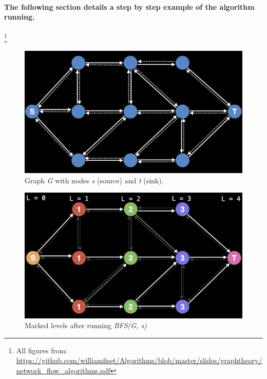 \documentclass{report}
\begin{document}
\paragraph{The following section details a step by step example of the algorithm running.}\footnote{All figures from: \url{https://github.com/williamfiset/Algorithms/blob/master/slides/graphtheory/network_flow_algorithms.pdf}}
\begin{figure}[!htb]
    \includegraphics[width=\textwidth]{assets/visual01.png}
    \centering
    \captionsetup{justification=centering,margin=2cm}
    \caption{Graph \textit{G} with nodes \textit{s} (source) and \textit{t} (sink).}
\end{figure}
\begin{figure}[!htb]
    \includegraphics[width=\textwidth]{assets/visual02.png}
    \centering
    \captionsetup{justification=centering,margin=2cm}
    \caption{Marked levels after running \textit{BFS(G, s)}}
\end{figure}
\pagebreak
\end{document}
